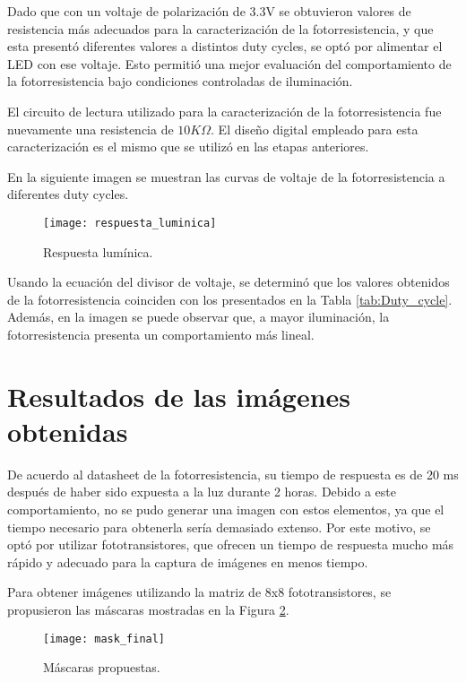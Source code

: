 Dado que con un voltaje de polarización de 3.3V se obtuvieron valores de resistencia más adecuados para la caracterización de la fotorresistencia, y que esta presentó diferentes valores a distintos duty cycles, se optó por alimentar el LED con ese voltaje. Esto permitió una mejor evaluación del comportamiento de la fotorresistencia bajo condiciones controladas de iluminación.


El circuito de lectura utilizado para la caracterización de la fotorresistencia fue nuevamente una resistencia de $10K\Omega$. El diseño digital empleado para esta caracterización es el mismo que se utilizó en las etapas anteriores.


En la siguiente imagen se muestran las curvas de voltaje de la fotorresistencia a diferentes duty cycles. 
            \begin{figure}[hbtp]
                \centering
                \texttt{[image: respuesta\_luminica]}
                \caption{Respuesta lumínica.}
                \label{fig:respuesta_luminica}
            \end{figure}            
            
Usando la ecuación del divisor de voltaje, se determinó que los valores obtenidos de la fotorresistencia coinciden con los presentados en la Tabla \ref{tab:Duty_cycle}. Además, en la imagen se puede observar que, a mayor iluminación, la fotorresistencia presenta un comportamiento más lineal.            

\section{Resultados de las imágenes obtenidas}
De acuerdo al datasheet de la fotorresistencia, su tiempo de respuesta es de 20 ms después de haber sido expuesta a la luz durante 2 horas. Debido a este comportamiento, no se pudo generar una imagen con estos elementos, ya que el tiempo necesario para obtenerla sería demasiado extenso. Por este motivo, se optó por utilizar fototransistores, que ofrecen un tiempo de respuesta mucho más rápido y adecuado para la captura de imágenes en menos tiempo.


Para obtener imágenes utilizando la matriz de 8x8 fototransistores, se propusieron las máscaras mostradas en la Figura \ref{fig:mask_final}.
            \begin{figure}[hbtp]
                \centering
                \texttt{[image: mask\_final]}
                \caption{Máscaras propuestas.}
                \label{fig:mask_final}
            \end{figure}  

